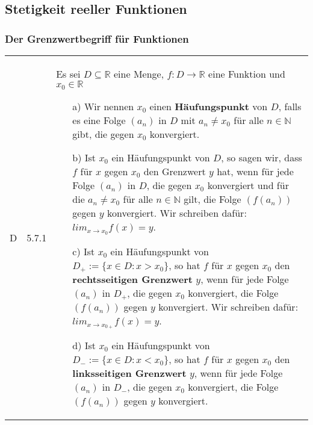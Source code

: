\pagebreak

\subsection{Stetigkeit reeller Funktionen}
\subsubsection{Der Grenzwertbegriff für Funktionen}

    \begin{longtable}{p{0.75cm} p{1cm} p{16cm}}
        \toprule

        D   & 5.7.1 &   Es sei $D \subseteq \mathbb{R}$ eine Menge, $f: D \rightarrow \mathbb{R}$ eine Funktion und $x_0 \in \mathbb{R}$
                        \begin{itemize}[topsep=-0.5cm]
                            \item[a)] Wir nennen $x_0$ einen \textbf{Häufungspunkt} von $D$, falls es eine Folge $(a_n)$ in $D$ mit
                                        $a_n \neq x_0$ für alle $n \in \mathbb{N}$ gibt, die gegen $x_0$ konvergiert.
                            \item[b)] Ist $x_0$ ein Häufungspunkt von $D$, so sagen wir, dass $f$ für $x$ gegen $x_0$ den Grenzwert 
                                        $y$ hat, wenn für jede Folge $(a_n)$ in $D$, die gegen $x_0$ konvergiert und für die
                                        $a_n \neq x_0$ für alle $n \in \mathbb{N}$ gilt, die Folge $(f(a_n))$ gegen $y$ konvergiert.
                                        \hfill \break Wir schreiben dafür: $lim_{x \rightarrow x_0} f(x) = y$.
                            \item[c)] Ist $x_0$ ein Häufungspunkt von $D_+ := \{ x \in D : x > x_0\}$, so hat $f$ für $x$ gegen $x_0$
                                        den \textbf{rechtsseitigen Grenzwert} $y$, wenn für jede Folge $(a_n)$ in $D_+$, die gegen
                                        $x_0$ konvergiert, die Folge $(f(a_n))$ gegen $y$ konvergiert.
                                        \hfill \break Wir schreiben dafür: $lim_{x \rightarrow x_{0+}} f(x) = y$.
                            \item[d)] Ist $x_0$ ein Häufungspunkt von $D_- := \{ x \in D : x < x_0\}$, so hat $f$ für $x$ gegen $x_0$
                                        den \textbf{linksseitigen Grenzwert} $y$, wenn für jede Folge $(a_n)$ in $D_-$, die gegen
                                        $x_0$ konvergiert, die Folge $(f(a_n))$ gegen $y$ konvergiert.

\end{itemize}
\end{longtable}
